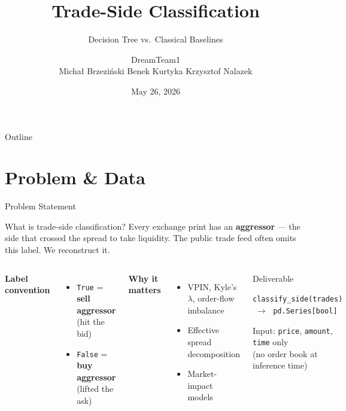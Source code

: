 \documentclass[aspectratio=169,10pt]{beamer}
\title{Trade-Side Classification}
\subtitle{Decision Tree vs.\ Classical Baselines}
\author{DreamTeam1 \\ \smallskip
  Michał Brzeziński \quad Benek Kurtyka \quad Krzysztof Nalazek}
\institute{Algorithmic Trading Systems Final Project}
\date{May 26, 2026}
\newcommand{\code}[1]{\texttt{\small #1}}
\begin{document}
\begin{frame}
  \titlepage
\end{frame}

\begin{frame}{Outline}
  \tableofcontents
\end{frame}

\section{Problem \& Data}

\begin{frame}{Problem Statement}
  \begin{block}{What is trade-side classification?}
    Every exchange print has an \textbf{aggressor} — the side that crossed the spread to take
    liquidity.  The public trade feed often omits this label.  We reconstruct it.
  \end{block}

  \medskip
  \begin{columns}[T]
    \textbf{Label convention}
    \begin{itemize}
      \item \code{True}  \;= \textbf{sell aggressor} \;(hit the bid)
      \item \code{False} = \textbf{buy aggressor} \quad(lifted the ask)
    \end{itemize}

    \medskip
    \textbf{Why it matters}
    \begin{itemize}
      \item VPIN, Kyle's $\lambda$, order-flow imbalance
      \item Effective spread decomposition
      \item Market-impact models
    \end{itemize}

    \begin{exampleblock}{Deliverable}
      \begin{center}
        \code{classify\_side(trades)} $\;\to\;$ \code{pd.Series[bool]}
      \end{center}
      \smallskip
      Input: \code{price}, \code{amount}, \code{time} only\\
      (no order book at inference time)
    \end{exampleblock}
  \end{columns}
\end{frame}
\end{document}
